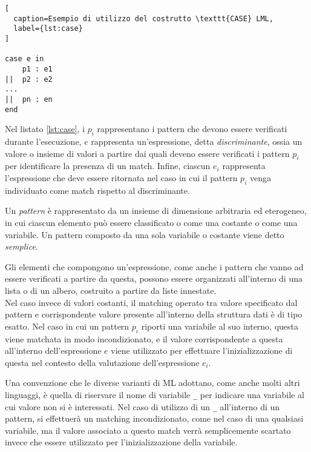 \newpage

\begin{lstlisting}[
  caption=Esempio di utilizzo del costrutto \texttt{CASE} LML,
  label={lst:case}
]

case e in
    p1 : e1
||  p2 : e2
...
||  pn : en
end

\end{lstlisting}

Nel listato \ref{lst:case}, i $p_i$ rappresentano i pattern che devono essere
verificati durante l'esecuzione, $e$ rappresenta un’espressione, detta
\textit{discriminante}, ossia un valore o insieme di valori a partire dai quali
deveno essere verificati i pattern $p_i$ per identificare la presenza di un
match. Infine, ciascun $e_i$ rappresenta l'espressione che deve essere ritornata
nel caso in cui il pattern $p_i$ venga individuato come match rispetto al
discriminante.

Un \textit{pattern} è rappresentato da un insieme di dimensione arbitraria ed
eterogeneo, in cui ciascun elemento può essere classificato o come una costante
o come una variabile. Un pattern composto da una sola variabile o costante viene
detto \textit{semplice}.

Gli elementi che compongono un'espressione, come anche i pattern che vanno ad
essere verificati a partire da questa, possono essere organizzati all’interno di
una lista o di un albero, costruito a partire da liste innestate.\\

Nel caso invece di valori costanti, il matching operato tra valore specificato
dal pattern e corrispondente valore presente all'interno della struttura dati è
di tipo esatto. Nel caso in cui un pattern $p_i$ riporti una variabile al suo
interno, questa viene matchata in modo incondizionato, e il valore
corrispondente a questa all’interno dell’espressione $e$ viene utilizzato per
effettuare l’inizializzazione di questa nel contesto della valutazione
dell'espressione $e_i$.

Una convenzione che le diverse varianti di ML adottano, come anche molti altri
linguaggi, è quella di riservare il nome di variabile \texttt{\_} per indicare
una variabile al cui valore non si è interessati. Nel caso di utilizzo di un
\texttt{\_} all’interno di un pattern, si effettuerà un matching incondizionato,
come nel caso di una qualsiasi variabile, ma il valore associato a questo match
verrà semplicemente scartato invece che essere utilizzato per l’inizializzazione
della variabile.

